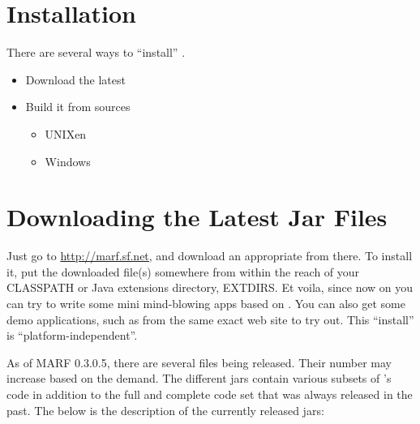 
\section{{\marf} Installation}

There are several ways to ``install'' {\marf}.

\begin{itemize}
\item
Download the latest 
\item
Build it from sources
	\begin{itemize}
	\item
	UNIXen
	\item
	Windows
	\end{itemize}
\end{itemize}


\section{Downloading the Latest Jar Files}
\label{sect:download-install-marf}

Just go to \url{http://marf.sf.net}, and download an appropriate 
from there.
To install it, put the downloaded  file(s) somewhere from within
the reach of your CLASSPATH or Java extensions directory, EXTDIRS.
Et voila, since now on you can try to write some mini mind-blowing
apps based on {\marf}. You can also get some demo applications,
such as  from the same exact web site
to try out.
This ``install'' is ``platform-independent''.

As of MARF 0.3.0.5, there are several  files being released.
Their number may increase based on the demand. The different jars contain
various subsets of {\marf}'s code in addition to the full and complete
code set that was always released in the past. The below is the description
of the currently released jars:

